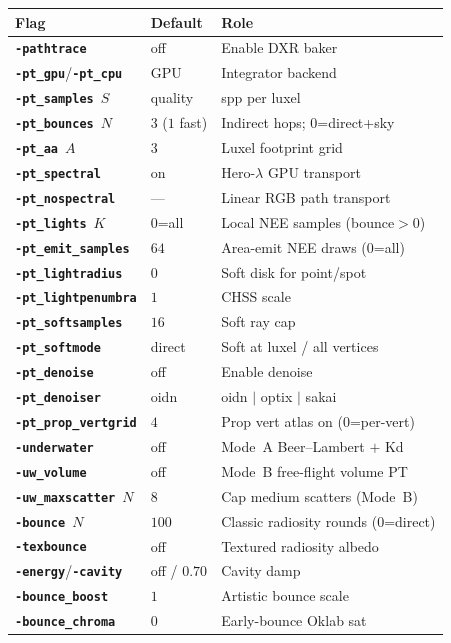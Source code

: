 \documentclass[11pt,a4paper]{article}
\newcommand{\flag}[1]{\texttt{\bfseries #1}}
\begin{document}
\begin{center}
\small
\begin{tabular}{@{}llp{5.8cm}@{}}
  \toprule
  Flag & Default & Role \\
  \midrule
  \flag{-pathtrace} & off & Enable DXR baker \\
  \flag{-pt\_gpu}/\flag{-pt\_cpu} & GPU & Integrator backend \\
  \flag{-pt\_samples}~$S$ & quality & spp per luxel \\
  \flag{-pt\_bounces}~$N$ & $3$ ($1$ fast) & Indirect hops; $0$=direct+sky \\
  \flag{-pt\_aa}~$A$ & $3$ & Luxel footprint grid \\
  \flag{-pt\_spectral} & on & Hero-$\lambda$ GPU transport \\
  \flag{-pt\_nospectral} & --- & Linear RGB path transport \\
  \flag{-pt\_lights}~$K$ & $0$=all & Local NEE samples (bounce$>0$) \\
  \flag{-pt\_emit\_samples} & $64$ & Area-emit NEE draws ($0$=all) \\
  \flag{-pt\_lightradius} & $0$ & Soft disk for point/spot \\
  \flag{-pt\_lightpenumbra} & $1$ & CHSS scale \\
  \flag{-pt\_softsamples} & $16$ & Soft ray cap \\
  \flag{-pt\_softmode} & direct & Soft at luxel / all vertices \\
  \flag{-pt\_denoise} & off & Enable denoise \\
  \flag{-pt\_denoiser} & oidn & oidn $\mid$ optix $\mid$ sakai \\
  \flag{-pt\_prop\_vertgrid} & $4$ & Prop vert atlas on ($0$=per-vert) \\
  \flag{-underwater} & off & Mode~A Beer--Lambert $+$ Kd \\
  \flag{-uw\_volume} & off & Mode~B free-flight volume PT \\
  \flag{-uw\_maxscatter}~$N$ & $8$ & Cap medium scatters (Mode~B) \\
  \flag{-bounce}~$N$ & $100$ & Classic radiosity rounds ($0$=direct) \\
  \flag{-texbounce} & off & Textured radiosity albedo \\
  \flag{-energy}/\flag{-cavity} & off / $0.70$ & Cavity damp \\
  \flag{-bounce\_boost} & $1$ & Artistic bounce scale \\
  \flag{-bounce\_chroma} & $0$ & Early-bounce Oklab sat \\

\end{tabular}
\end{center}
\end{document}
